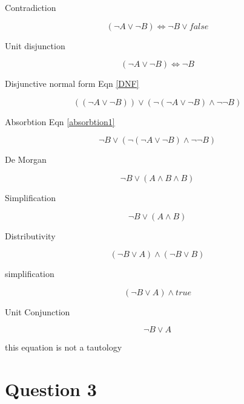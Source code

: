 \documentclass[10pt,a4paper]{article}
\begin{document}
Contradiction

\begin{equation}
(\neg A \vee \neg B )  \Leftrightarrow \neg B \vee false
\end{equation}

Unit disjunction 

\begin{equation}
(\neg A \vee \neg B )  \Leftrightarrow \neg B
\end{equation}

Disjunctive normal form Eqn \ref{DNF}

\begin{equation}
((\neg A \vee \neg B)) \vee (\neg(\neg A \vee \neg B) \wedge \neg\neg B)
\end{equation}

Absorbtion Eqn \ref{absorbtion1}

\begin{equation}
 \neg B \vee  (\neg(\neg A \vee \neg B) \wedge \neg\neg B)
\end{equation}

De Morgan

\begin{equation}
 \neg B \vee  ( A \wedge B \wedge  B)
\end{equation}

Simplification 

\begin{equation}
 \neg B \vee  ( A \wedge B)
\end{equation}

Distributivity

\begin{equation}
(\neg B \vee A) \wedge (\neg B \vee B) 
\end{equation}

simplification

\begin{equation}
(\neg B \vee A) \wedge true 
\end{equation}

Unit Conjunction 

\begin{equation}
\neg B \vee A 
\end{equation}

this equation is not a tautology

\section{Question 3}
\end{document}
